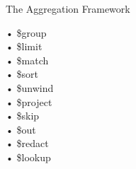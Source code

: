 \documentclass{beamer}
\begin{document}
\begin{frame}{The Aggregation Framework}

\begin{Alms*}
	• \$group \\
	• \$limit \\
	• \$match \\
	• \$sort \\
	• \$unwind \\
	• \$project \\
	• \$skip \\
	• \$out \\
	• \$redact \\
	• \$lookup \\
\end{Alms*}

\end{frame}


\end{document}
